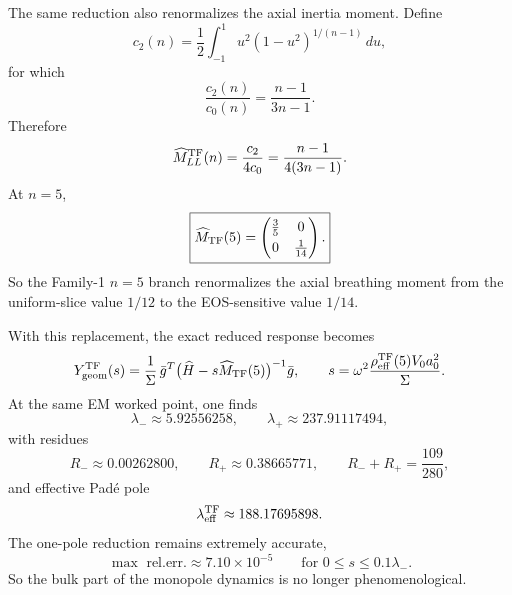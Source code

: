 \documentclass[11pt]{article}
\begin{document}
The same reduction also renormalizes the axial inertia moment.
Define
\begin{equation}
c_2(n)=\frac12\int_{-1}^{1}u^2(1-u^2)^{1/(n-1)}\,du,
\label{eq:geom-breathing-c2n-def}
\end{equation}
for which
\begin{equation}
\frac{c_2(n)}{c_0(n)}=\frac{n-1}{3n-1}.
\label{eq:geom-breathing-c2-over-c0}
\end{equation}
Therefore
\begin{equation}
\widehat M_{LL}^{\rm TF}(n)=\frac{c_2}{4c_0}=\frac{n-1}{4(3n-1)}.
\label{eq:geom-breathing-MLL-TFn}
\end{equation}
At \(n=5\),
\begin{equation}
\boxed{
\widehat M_{\rm TF}(5)=
\begin{pmatrix}
\frac35 & 0\\[3pt]
0 & \frac1{14}
\end{pmatrix}.
}
\label{eq:geom-breathing-Mhat-TF5}
\end{equation}
So the Family-1 \(n=5\) branch renormalizes the axial breathing moment from the
uniform-slice value \(1/12\) to the EOS-sensitive value \(1/14\).

With this replacement, the exact reduced response becomes
\begin{equation}
Y_{\rm geom}^{\rm TF}(s)=
\frac{1}{\Sigma}\,
\bar g^T\bigl(\widehat H-s\widehat M_{\rm TF}(5)\bigr)^{-1}\bar g,
\qquad
s=\omega^2\frac{\rho_{\rm eff}^{\rm TF}(5)V_0a_0^2}{\Sigma}.
\label{eq:geom-breathing-Ygeom-TF}
\end{equation}
At the same EM worked point, one finds
\begin{equation}
\lambda_-\approx 5.92556258,
\qquad
\lambda_+\approx 237.91117494,
\label{eq:geom-breathing-lambdas-TF}
\end{equation}
with residues
\begin{equation}
R_-\approx 0.00262800,
\qquad
R_+\approx 0.38665771,
\qquad
R_-+R_+=\frac{109}{280},
\label{eq:geom-breathing-residues-TF}
\end{equation}
and effective Pad\'e pole
\begin{equation}
\lambda_{\rm eff}^{\rm TF}\approx 188.17695898.
\label{eq:geom-breathing-lambdaeff-TF}
\end{equation}
The one-pole reduction remains extremely accurate,
\begin{equation}
\max\text{ rel.err.}\approx 7.10\times 10^{-5}
\qquad
\text{for } 0\le s\le 0.1\lambda_-.
\label{eq:geom-breathing-TF-error}
\end{equation}
So the bulk part of the monopole dynamics is no longer phenomenological.
\end{document}
